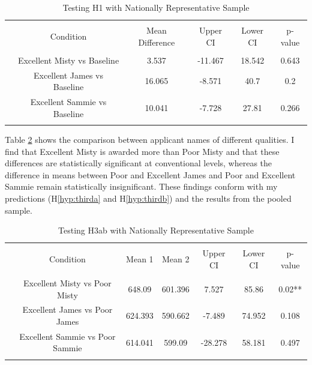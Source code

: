 \documentclass[12pt]{article}%
\begin{document}
\begin{doublespace}
\begin{table}[!h] \centering 
	\caption{Testing H1 with Nationally Representative Sample} 
	\label{six} 
	\footnotesize 
	\begin{tabular}{@{\extracolsep{1pt}} cccccc} 
		\\[-1.8ex]\hline \\[-1.8ex] 
		& Condition & Mean Difference & Upper CI & Lower CI & p-value \\ 
		\hline \\[-1.8ex] 
		& Excellent Misty vs Baseline & 3.537 & -11.467 & 18.542 & 0.643 \\ 
		& Excellent James vs Baseline & 16.065 & -8.571 & 40.7 & 0.2 \\ 
		& Excellent Sammie vs Baseline & 10.041 & -7.728 & 27.81 & 0.266 \\ 
		\hline \\[-1.8ex] 
	\end{tabular} 
\end{table} 


Table \ref{seven} shows the comparison between applicant names of different qualities. I find that Excellent Misty is awarded more than Poor Misty and that these differences are statistically significant at conventional levels, whereas the difference in means between Poor and Excellent James and Poor and Excellent Sammie remain statistically insignificant. These findings conform with my predictions (H\ref{hyp:thirda} and H\ref{hyp:thirdb}) and the results from the pooled sample.


\begin{table}[!htbp] \centering 
	\caption{Testing H3ab with Nationally Representative Sample} 
	\label{seven} 
	\footnotesize 
	\begin{tabular}{@{\extracolsep{1pt}} ccccccc} 
		\\[-1.8ex]\hline \\[-1.8ex] 
		& Condition & Mean 1 & Mean 2 & Upper CI & Lower CI & p-value \\ 
		\hline \\[-1.8ex] 
		& Excellent Misty vs Poor Misty & 648.09 & 601.396 & 7.527 & 85.86 & 0.02** \\ 
		& Excellent James vs Poor James & 624.393 & 590.662 & -7.489 & 74.952 & 0.108 \\ 
		& Excellent Sammie vs Poor Sammie & 614.041 & 599.09 & -28.278 & 58.181 & 0.497 \\ 
		\hline \\[-1.8ex] 
	\end{tabular} 
\end{table} 



\end{doublespace}
\end{document}
